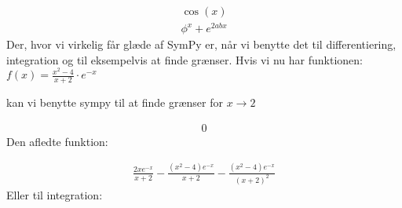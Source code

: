 \documentclass[letterpaper,10pt,english]{jupyterBook}
\begin{document}
\begin{sphinxVerbatim}[commandchars=\\\{\}]
                       
      
\end{sphinxVerbatim}
\begin{equation*}
\begin{split}\displaystyle \cos{\left(x \right)}\end{split}
\end{equation*}\begin{equation*}
\begin{split}\displaystyle \phi^{x} + e^{2 a b x}\end{split}
\end{equation*}
Der, hvor vi virkelig får glæde af SymPy er, når vi benytte det til differentiering, integration og til eksempelvis at finde grænser. Hvis vi nu har funktionen:\( f(x) = \frac{x^2 - 4}{x + 2} \cdot e^{-x}\)

kan vi benytte sympy til at finde grænser for \(x \longrightarrow 2\)

\begin{sphinxVerbatim}[commandchars=\\\{\}]
   
         
  
\end{sphinxVerbatim}
\begin{equation*}
\begin{split}\displaystyle 0\end{split}
\end{equation*}
Den afledte funktion:

\begin{sphinxVerbatim}[commandchars=\\\{\}]
 
\end{sphinxVerbatim}
\begin{equation*}
\begin{split}\displaystyle \frac{2 x e^{- x}}{x + 2} - \frac{\left(x^{2} - 4\right) e^{- x}}{x + 2} - \frac{\left(x^{2} - 4\right) e^{- x}}{\left(x + 2\right)^{2}}\end{split}
\end{equation*}
Eller til integration:
\end{document}

